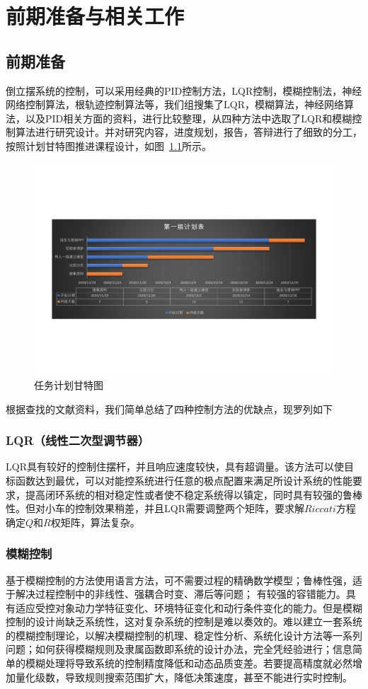 \chapter{前期准备与相关工作}
\section{前期准备}

倒立摆系统的控制，可以采用经典的PID控制方法，LQR控制，模糊控制法，神经网络控制算法，根轨迹控制算法等，我们组搜集了LQR，模糊算法，神经网络算法，以及PID相关方面的资料，进行比较整理，从四种方法中选取了LQR和模糊控制算法进行研究设计。并对研究内容，进度规划，报告，答辩进行了细致的分工，按照计划甘特图推进课程设计，如图~\ref{fig:gant}所示。

\begin{figure}[h]
\centering
    \includegraphics[width=12cm]{gant.pdf}
    \caption{任务计划甘特图}
    \label{fig:gant}
\end{figure}


根据查找的文献资料，我们简单总结了四种控制方法的优缺点，现罗列如下

\subsection{LQR（线性二次型调节器）}
 LQR具有较好的控制住摆杆，并且响应速度较快，具有超调量。该方法可以使目标函数达到最优，可以对能控系统进行任意的极点配置来满足所设计系统的性能要求，提高闭环系统的相对稳定性或者使不稳定系统得以镇定，同时具有较强的鲁棒性。但对小车的控制效果稍差，并且LQR需要调整两个矩阵，要求解$Riccati$方程确定$Q$和$R$权矩阵，算法复杂。

\subsection{模糊控制}
基于模糊控制的方法使用语言方法，可不需要过程的精确数学模型；鲁棒性强，适于解决过程控制中的非线性、强耦合时变、滞后等问题；
有较强的容错能力。具有适应受控对象动力学特征变化、环境特征变化和动行条件变化的能力。但是模糊控制的设计尚缺乏系统性，这对复杂系统的控制是难以奏效的。难以建立一套系统的模糊控制理论，以解决模糊控制的机理、稳定性分析、系统化设计方法等一系列问题；如何获得模糊规则及隶属函数即系统的设计办法，完全凭经验进行；信息简单的模糊处理将导致系统的控制精度降低和动态品质变差。若要提高精度就必然增加量化级数，导致规则搜索范围扩大，降低决策速度，甚至不能进行实时控制。

